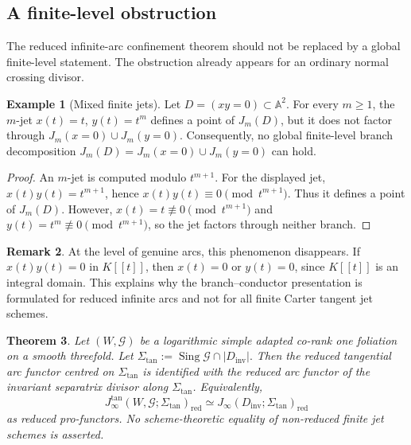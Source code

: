 \documentclass[11pt]{amsart}
\numberwithin{equation}{section}
\theoremstyle{plain}
\newtheorem{Theorem}{Theorem}[section]
\theoremstyle{definition}
\newtheorem{Example}[Theorem]{Example}
\newtheorem{Remark}[Theorem]{Remark}
\newcommand{\Sing}{\operatorname{Sing}}
\newcommand{\Sigmatan}{\Sigma_{\mathrm{tan}}}
\newcommand{\red}{\mathrm{red}}
\newcommand{\Dinv}{D_{\mathrm{inv}}}
\newcommand{\bA}{\mathbb A}
\newcommand{\cG}{\mathcal G}
\begin{document}
\subsection{A finite-level obstruction}

The reduced infinite-arc confinement theorem should not be replaced by a
global finite-level statement.  The obstruction already appears for an
ordinary normal crossing divisor.

\begin{Example}[Mixed finite jets]
\label{ex:mixed-finite-jets}
Let $D=(xy=0)\subset\bA^2$.  For every $m\geq 1$, the $m$-jet
$x(t)=t$, $y(t)=t^m$ defines a point of $J_m(D)$, but it does not factor
through $J_m(x=0)\cup J_m(y=0)$.  Consequently, no global finite-level branch
decomposition $J_m(D)=J_m(x=0)\cup J_m(y=0)$ can hold.
\end{Example}

\begin{proof}
An $m$-jet is computed modulo $t^{m+1}$.  For the displayed jet,
$x(t)y(t)=t^{m+1}$, hence $x(t)y(t)\equiv0\pmod{t^{m+1}}$.  Thus it
defines a point of $J_m(D)$.  However, $x(t)=t\not\equiv0\pmod{t^{m+1}}$
and $y(t)=t^m\not\equiv0\pmod{t^{m+1}}$, so the jet factors through
neither branch.
\end{proof}

\begin{Remark}
At the level of genuine arcs, this phenomenon disappears.  If $x(t)y(t)=0$
in $K[[t]]$, then $x(t)=0$ or $y(t)=0$, since $K[[t]]$ is an integral domain.
This explains why the branch--conductor presentation is formulated for
reduced infinite arcs and not for all finite Carter tangent jet schemes.
\end{Remark}

\begin{Theorem}
\label{thm:formal-rep}
Let \((W,\cG)\) be a logarithmic simple adapted co-rank one foliation on a
smooth threefold. Let
$
\Sigmatan:=\Sing\cG\cap |\Dinv|.
$
Then the reduced tangential arc functor centred on \(\Sigmatan\) is
identified with the reduced arc functor of the invariant separatrix divisor
along \(\Sigmatan\). Equivalently,
\[
J_\infty^{\tan}(W,\cG;\Sigmatan)_{\red}
\simeq
J_\infty(\Dinv;\Sigmatan)_{\red}
\]
as reduced pro-functors. No scheme-theoretic equality of non-reduced finite
jet schemes is asserted.
\end{Theorem}
\end{document}
